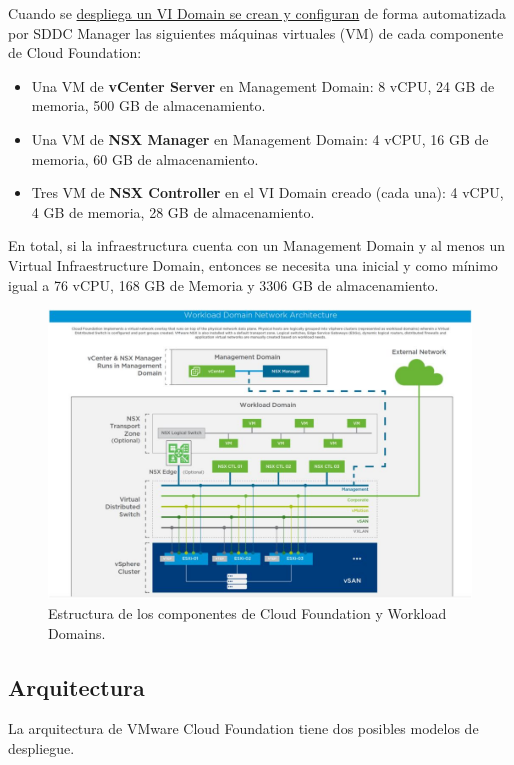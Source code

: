Cuando se \underline{despliega un VI Domain se crean y configuran} de forma automatizada por SDDC Manager las siguientes máquinas virtuales (VM) de cada componente de Cloud Foundation:
\begin{itemize}
    \item Una VM de \textbf{vCenter Server} en Management Domain: 8 vCPU, 24 GB de memoria, 500 GB de almacenamiento.
    \item Una VM de \textbf{NSX Manager} en Management Domain: 4 vCPU, 16 GB de memoria, 60 GB de almacenamiento.
    \item Tres VM de \textbf{NSX Controller} en el VI Domain creado (cada una):  4 vCPU, 4 GB de memoria, 28 GB de almacenamiento.
\end{itemize}

En total, si la infraestructura cuenta con un Management Domain y al menos un Virtual Infraestructure Domain, entonces se necesita una  inicial y como mínimo igual a 76 vCPU, 168 GB de Memoria y 3306 GB de almacenamiento.

\begin{figure}[h!]
  \centering
  \includegraphics[width=1\textwidth]{imaxes/conceptosPrevios/WDomainStructure.JPG}
  \caption{Estructura de los componentes de Cloud Foundation y Workload Domains.}
  \label{fig:esquemaCFDominios}
\end{figure}

\FloatBarrier

\subsection{Arquitectura}
La arquitectura de VMware Cloud Foundation tiene dos posibles modelos de despliegue.

